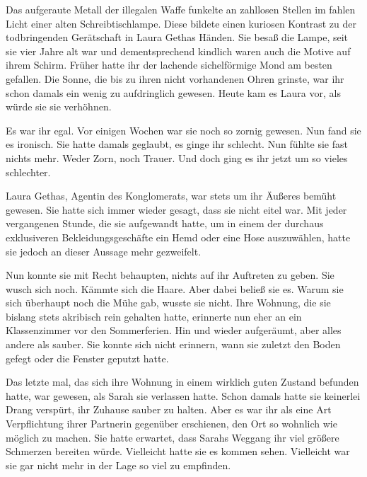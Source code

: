 Das aufgeraute Metall der illegalen Waffe funkelte an zahllosen Stellen im fahlen Licht einer alten Schreibtischlampe. Diese bildete einen kuriosen Kontrast zu der todbringenden Gerätschaft in Laura Gethas Händen. Sie besaß die Lampe, seit sie vier Jahre alt war und dementsprechend kindlich waren auch die Motive auf ihrem Schirm. Früher hatte ihr der lachende sichelförmige Mond am besten gefallen. Die Sonne, die bis zu ihren nicht vorhandenen Ohren grinste, war ihr schon damals ein wenig zu aufdringlich gewesen. Heute kam es Laura vor, als würde sie sie verhöhnen.

\par

Es war ihr egal. Vor einigen Wochen war sie noch so zornig gewesen. Nun fand sie es ironisch. Sie hatte damals geglaubt, es ginge ihr schlecht. Nun fühlte sie fast nichts mehr. Weder Zorn, noch Trauer. Und doch ging es ihr jetzt um so vieles schlechter.

\par

Laura Gethas, Agentin des Konglomerats, war stets um ihr Äußeres bemüht gewesen. Sie hatte sich immer wieder gesagt, dass sie nicht eitel war. Mit jeder vergangenen Stunde, die sie aufgewandt hatte, um in einem der durchaus exklusiveren Bekleidungsgeschäfte ein Hemd oder eine Hose auszuwählen, hatte sie jedoch an dieser Aussage mehr gezweifelt.

\par

Nun konnte sie mit Recht behaupten, nichts auf ihr Auftreten zu geben. Sie wusch sich noch. Kämmte sich die Haare. Aber dabei beließ sie es. Warum sie sich überhaupt noch die Mühe gab, wusste sie nicht. Ihre Wohnung, die sie bislang stets akribisch rein gehalten hatte, erinnerte nun eher an ein Klassenzimmer vor den Sommerferien. Hin und wieder aufgeräumt, aber alles andere als sauber. Sie konnte sich nicht erinnern, wann sie zuletzt den Boden gefegt oder die Fenster geputzt hatte.

\par

Das letzte mal, das sich ihre Wohnung in einem wirklich guten Zustand befunden hatte, war gewesen, als Sarah sie verlassen hatte. Schon damals hatte sie keinerlei Drang verspürt, ihr Zuhause sauber zu halten. Aber es war ihr als eine Art Verpflichtung ihrer Partnerin gegenüber erschienen, den Ort so wohnlich wie möglich zu machen. Sie hatte erwartet, dass Sarahs Weggang ihr viel größere Schmerzen bereiten würde. Vielleicht hatte sie es kommen sehen. Vielleicht war sie gar nicht mehr in der Lage so viel zu empfinden.


